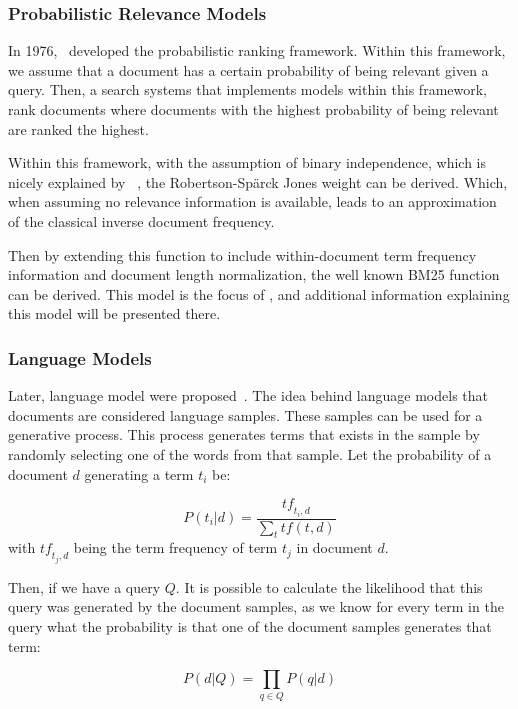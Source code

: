 \subsubsection{Probabilistic Relevance Models}
In 1976,~\citeauthor{RSJ} developed the probabilistic ranking framework. Within this framework, we assume that a document has a certain probability of being relevant given a query. Then, a search systems that implements models within this framework, rank documents where documents with the highest probability of being relevant are ranked the highest.

Within this framework, with the assumption of binary independence, which is nicely explained by ~\citet{bm25-beyond}, the Robertson-Sp{\"a}rck Jones weight can be derived. Which, when assuming no relevance information is available, leads to an approximation of the classical inverse document frequency.

Then by extending this function to include within-document term frequency information and document length normalization, the well known BM25 function can be derived.
This model is the focus of , and additional information explaining this model will be presented there.

\subsubsection{Language Models}
Later, language model were proposed~\citep{croft_lm, hiemstra_lm, zhai_lm}. The idea behind language models that documents are considered language samples. These samples can be used for a generative process. This process generates terms that exists in the sample by randomly selecting one of the words from that sample. Let the probability of a document $d$ generating a term $t_i$ be:

\begin{equation}
	P(t_i|d) = \frac{\mathit{tf}_{t_i,d}}{\sum_t tf(t, d)}
\end{equation}
with $\mathit{tf}_{t_j, d}$ being the term frequency of term $t_j$ in document $d$. 

Then, if we have a query $Q$. It is possible to calculate the likelihood that this query was generated by the document samples, as we know for every term in the query what the probability is that one of the document samples generates that term: 

\begin{equation}
	P(d|Q) = \prod_{q \in Q} P(q | d)
\end{equation}

